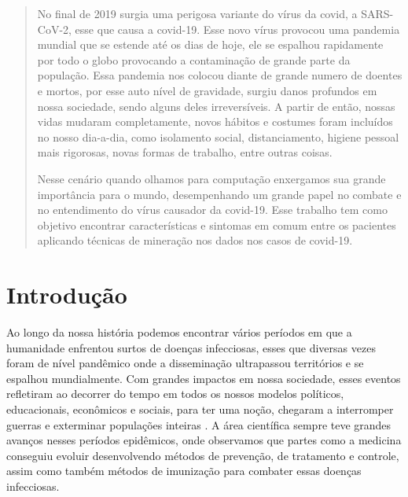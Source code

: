 \documentclass[tcc1]{uftex}
\begin{document}
  \begin{abstract}
  \setlength{\parindent}{1.25cm}
    No final de 2019 surgia uma perigosa variante do vírus da covid, a SARS-CoV-2, esse que causa a covid-19. Esse novo vírus provocou uma pandemia mundial que se estende até os dias de hoje, ele se espalhou rapidamente por todo o globo provocando a contaminação de grande parte da população. Essa pandemia nos colocou diante de grande numero de doentes e mortos, por esse auto nível de gravidade, surgiu danos profundos em nossa sociedade, sendo alguns deles irreversíveis. A partir de então, nossas vidas mudaram completamente, novos hábitos e costumes foram incluídos no nosso dia-a-dia, como isolamento social, distanciamento, higiene pessoal mais rigorosas, novas formas de trabalho, entre outras coisas.
    
    Nesse cenário quando olhamos para computação enxergamos sua grande importância para o mundo, desempenhando um grande papel no combate e no entendimento do vírus causador da covid-19. Esse trabalho tem como objetivo encontrar características e sintomas em comum entre os pacientes aplicando técnicas de mineração nos dados nos casos de covid-19.  
  \end{abstract}

  
  \printlosymbols  
  \printloabbreviations
  \listoffigures
  \listoftables 
  \tableofcontents %
\mainmatter
\onehalfspacing
\chapter{Introdução}

Ao longo da nossa história podemos encontrar vários períodos em que a humanidade enfrentou surtos de doenças infecciosas, esses que diversas vezes foram de nível pandêmico onde a disseminação ultrapassou territórios e se espalhou mundialmente. Com grandes impactos em nossa sociedade, esses eventos refletiram ao decorrer do tempo em todos os nossos modelos políticos, educacionais, econômicos e sociais, para ter uma noção, chegaram a interromper guerras e exterminar populações inteiras \cite{huremovic2019brief}. A área científica sempre teve grandes avanços nesses períodos epidêmicos, onde observamos que partes como a medicina conseguiu evoluir desenvolvendo métodos de prevenção, de tratamento e controle, assim como também métodos de imunização para combater essas doenças infecciosas.
	
\end{document}
